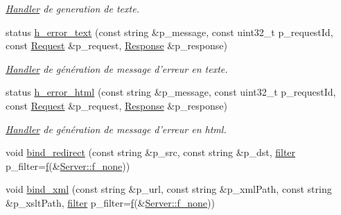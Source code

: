 \begin{DoxyCompactItemize}
\begin{DoxyCompactList}\small\item\em \hyperlink{classxtd_1_1network_1_1http_1_1Server_1_1Handler}{Handler} de generation de texte. \end{DoxyCompactList}\item 
status \hyperlink{classxtd_1_1network_1_1http_1_1Server_a39656db929894be1af465c0409c22f35}{h\-\_\-error\-\_\-text} (const string \&p\-\_\-message, const uint32\-\_\-t p\-\_\-request\-Id, const \hyperlink{classxtd_1_1network_1_1http_1_1Request}{Request} \&p\-\_\-request, \hyperlink{classxtd_1_1network_1_1http_1_1Response}{Response} \&p\-\_\-response)
\begin{DoxyCompactList}\small\item\em \hyperlink{classxtd_1_1network_1_1http_1_1Server_1_1Handler}{Handler} de génération de message d'erreur en texte. \end{DoxyCompactList}\item 
status \hyperlink{classxtd_1_1network_1_1http_1_1Server_ac2b937b63242559f3a2dd45627f31de3}{h\-\_\-error\-\_\-html} (const string \&p\-\_\-message, const uint32\-\_\-t p\-\_\-request\-Id, const \hyperlink{classxtd_1_1network_1_1http_1_1Request}{Request} \&p\-\_\-request, \hyperlink{classxtd_1_1network_1_1http_1_1Response}{Response} \&p\-\_\-response)
\begin{DoxyCompactList}\small\item\em \hyperlink{classxtd_1_1network_1_1http_1_1Server_1_1Handler}{Handler} de génération de message d'erreur en html. \end{DoxyCompactList}\item 
void \hyperlink{classxtd_1_1network_1_1http_1_1Server_a4eed9eec0caf2f786f45e07161512cad}{bind\-\_\-redirect} (const string \&p\-\_\-src, const string \&p\-\_\-dst, \hyperlink{structxtd_1_1network_1_1http_1_1Server_1_1Handler_1_1filter}{filter} p\-\_\-filter=\hyperlink{classxtd_1_1network_1_1http_1_1Server_a49f38021cb4d61f2c3027785f8fa561c}{f}(\&\hyperlink{classxtd_1_1network_1_1http_1_1Server_a1007cdff295e30f0009f07c70e8bafcc}{Server\-::f\-\_\-none}))
\item 
void \hyperlink{classxtd_1_1network_1_1http_1_1Server_ac8a629eca201fca1dee43fa6b58be0e7}{bind\-\_\-xml} (const string \&p\-\_\-url, const string \&p\-\_\-xml\-Path, const string \&p\-\_\-xslt\-Path, \hyperlink{structxtd_1_1network_1_1http_1_1Server_1_1Handler_1_1filter}{filter} p\-\_\-filter=\hyperlink{classxtd_1_1network_1_1http_1_1Server_a49f38021cb4d61f2c3027785f8fa561c}{f}(\&\hyperlink{classxtd_1_1network_1_1http_1_1Server_a1007cdff295e30f0009f07c70e8bafcc}{Server\-::f\-\_\-none}))

\end{DoxyCompactItemize}
